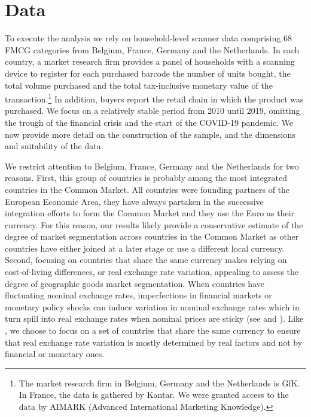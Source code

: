 \section{Data}\label{sec:data}
To execute the analysis we rely on household-level scanner data comprising 68 FMCG categories from Belgium, France, Germany and the Netherlands. In each country, a market research firm provides a panel of households with a scanning device to register for each purchased barcode the number of units bought, the total volume purchased and the total tax-inclusive monetary value of the transaction.\footnote{The market research firm in Belgium, Germany and the Netherlands is GfK. In France, the data is gathered by Kantar. We were granted access to the data by AIMARK (Advanced International Marketing Knowledge).} In addition, buyers report the retail chain in which the product was purchased. We focus on a relatively stable period from 2010 until 2019, omitting the trough of the financial crisis and the start of the COVID-19 pandemic. We now provide more detail on the construction of the sample, and the dimensions and suitability of the data.

We restrict attention to Belgium, France, Germany and the Netherlands for two reasons. First, this group of countries is probably among the most integrated countries in the Common Market. All countries were founding partners of the European Economic Area, they have always partaken in the successive integration efforts to form the Common Market and they use the Euro as their currency. For this reason, our results likely provide a conservative estimate of the degree of market segmentation across countries in the Common Market as other countries have either joined at a later stage or use a different local currency. Second, focusing on countries that share the same currency makes relying on cost-of-living differences, or real exchange rate variation, appealing to assess the degree of geographic goods market segmentation. When countries have fluctuating nominal exchange rates, imperfections in financial markets or monetary policy shocks can induce variation in nominal exchange rates which in turn spill into real exchange rates when nominal prices are sticky (see \citet{Heathcote2014} and \citet{Itskhoki2021}). Like \citet{Berka2018}, we choose to focus on a set of countries that share the same currency to ensure that real exchange rate variation is mostly determined by real factors and not by financial or monetary ones. 

